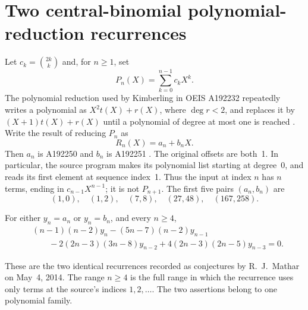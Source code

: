 \section{Two central-binomial polynomial-reduction recurrences}
\label{sec:a192250}

Let $c_k=\binom{2k}{k}$ and, for $n\geq 1$, set
\[
 P_n(X)=\sum_{k=0}^{n-1}c_kX^k.
\]
The polynomial reduction used by Kimberling in OEIS A192232 repeatedly
writes a polynomial as $X^2t(X)+r(X)$, where $\deg r<2$, and replaces it by
$(X+1)t(X)+r(X)$ until a polynomial of degree at most one is reached
\cite{OEISA192232}. Write the result of reducing $P_n$ as
\[
 R_n(X)=a_n+b_nX.
\]
Then $a_n$ is A192250 and $b_n$ is A192251
\cite{OEISA192250,OEISA192251}. The original offsets are both~1.
In particular, the source program makes its polynomial list starting at
degree~0, and reads its first element at sequence index~1. Thus the input
at index $n$ has $n$ terms, ending in $c_{n-1}X^{n-1}$; it is not $P_{n+1}$.
The first five pairs $(a_n,b_n)$ are
\[
(1,0),\quad(1,2),\quad(7,8),\quad(27,48),\quad(167,258).
\]

\begin{theorem}
For either $y_n=a_n$ or $y_n=b_n$, and every $n\geq4$,
\begin{equation}
\label{eq:a192250-mathar}
\begin{split}
 &(n-1)(n-2)y_n-(5n-7)(n-2)y_{n-1}\\
 &\qquad{}-2(2n-3)(3n-8)y_{n-2}
       +4(2n-3)(2n-5)y_{n-3}=0.
\end{split}
\end{equation}
\end{theorem}

These are the two identical recurrences recorded as conjectures by
R.~J.~Mathar on May~4, 2014. The range $n\geq4$ is the full range in
which the recurrence uses only terms at the source's indices $1,2,\ldots$.
The two assertions belong to one polynomial family.

